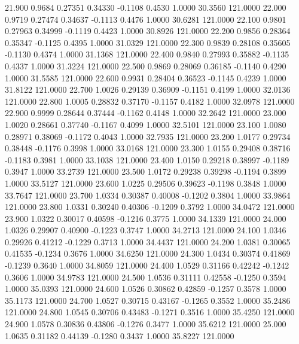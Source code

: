   21.900   0.9684   0.27351   0.34330  -0.1108   0.4530   1.0000  30.3560 121.0000
  22.000   0.9719   0.27474   0.34637  -0.1113   0.4476   1.0000  30.6281 121.0000
  22.100   0.9801   0.27963   0.34999  -0.1119   0.4423   1.0000  30.8926 121.0000
  22.200   0.9856   0.28364   0.35347  -0.1125   0.4395   1.0000  31.0329 121.0000
  22.300   0.9839   0.28108   0.35605  -0.1130   0.4374   1.0000  31.1368 121.0000
  22.400   0.9840   0.27993   0.35882  -0.1135   0.4337   1.0000  31.3224 121.0000
  22.500   0.9869   0.28069   0.36185  -0.1140   0.4290   1.0000  31.5585 121.0000
  22.600   0.9931   0.28404   0.36523  -0.1145   0.4239   1.0000  31.8122 121.0000
  22.700   1.0026   0.29139   0.36909  -0.1151   0.4199   1.0000  32.0136 121.0000
  22.800   1.0005   0.28832   0.37170  -0.1157   0.4182   1.0000  32.0978 121.0000
  22.900   0.9999   0.28644   0.37444  -0.1162   0.4148   1.0000  32.2642 121.0000
  23.000   1.0020   0.28661   0.37740  -0.1167   0.4099   1.0000  32.5101 121.0000
  23.100   1.0080   0.28971   0.38069  -0.1172   0.4043   1.0000  32.7935 121.0000
  23.200   1.0177   0.29734   0.38448  -0.1176   0.3998   1.0000  33.0168 121.0000
  23.300   1.0155   0.29408   0.38716  -0.1183   0.3981   1.0000  33.1038 121.0000
  23.400   1.0150   0.29218   0.38997  -0.1189   0.3947   1.0000  33.2739 121.0000
  23.500   1.0172   0.29238   0.39298  -0.1194   0.3899   1.0000  33.5127 121.0000
  23.600   1.0225   0.29506   0.39623  -0.1198   0.3848   1.0000  33.7647 121.0000
  23.700   1.0334   0.30387   0.40008  -0.1202   0.3804   1.0000  33.9864 121.0000
  23.800   1.0331   0.30240   0.40306  -0.1209   0.3792   1.0000  34.0472 121.0000
  23.900   1.0322   0.30017   0.40598  -0.1216   0.3775   1.0000  34.1339 121.0000
  24.000   1.0326   0.29907   0.40900  -0.1223   0.3747   1.0000  34.2713 121.0000
  24.100   1.0346   0.29926   0.41212  -0.1229   0.3713   1.0000  34.4437 121.0000
  24.200   1.0381   0.30065   0.41535  -0.1234   0.3676   1.0000  34.6250 121.0000
  24.300   1.0434   0.30374   0.41869  -0.1239   0.3640   1.0000  34.8059 121.0000
  24.400   1.0529   0.31166   0.42242  -0.1242   0.3606   1.0000  34.9783 121.0000
  24.500   1.0536   0.31111   0.42558  -0.1250   0.3594   1.0000  35.0393 121.0000
  24.600   1.0526   0.30862   0.42859  -0.1257   0.3578   1.0000  35.1173 121.0000
  24.700   1.0527   0.30715   0.43167  -0.1265   0.3552   1.0000  35.2486 121.0000
  24.800   1.0545   0.30706   0.43483  -0.1271   0.3516   1.0000  35.4250 121.0000
  24.900   1.0578   0.30836   0.43806  -0.1276   0.3477   1.0000  35.6212 121.0000
  25.000   1.0635   0.31182   0.44139  -0.1280   0.3437   1.0000  35.8227 121.0000
